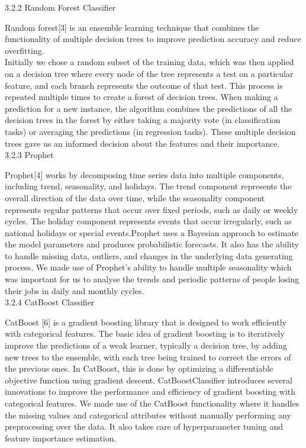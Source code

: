 \documentclass[fleqn,10pt]{SelfArx} %
\begin{document}
3.2.2 Random Forest Classifier 

Random forest[3] is an ensemble learning technique that combines the functionality of multiple decision trees to improve prediction accuracy and reduce overfitting.\\
Initially we chose a random subset of the training data, which was then applied on a decision tree where every node of the tree represents a test on a particular feature, and each branch represents the outcome of that test. This process is repeated multiple times to create a forest of decision trees.
When making a prediction for a new instance, the algorithm combines the predictions of all the decision trees in the forest by either taking a majority vote (in classification tasks) or averaging the predictions (in regression tasks). These multiple decision trees gave us an informed decision about the features and their importance. \\

3.2.3 Prophet

Prophet[4] works by decomposing time series data into multiple components, including trend, seasonality, and holidays. The trend component represents the overall direction of the data over time, while the seasonality component represents regular patterns that occur over fixed periods, such as daily or weekly cycles. The holiday component represents events that occur irregularly, such as national holidays or special events.Prophet uses a Bayesian approach to estimate the model parameters and produces probabilistic forecasts. It also has the ability to handle missing data, outliers, and changes in the underlying data generating process. We made use of Prophet's ability to handle multiple seasonality which was important for us to analyse the trends and periodic patterns of people losing their jobs in daily and monthly cycles. \\

3.2.4 CatBoost Classifier

CatBoost [6] is a gradient boosting library that is designed to work efficiently with categorical features. The basic idea of gradient boosting is to iteratively improve the predictions of a weak learner, typically a decision tree, by adding new trees to the ensemble, with each tree being trained to correct the errors of the previous ones. In CatBoost, this is done by optimizing a differentiable objective function using gradient descent. CatBoostClassifier introduces several innovations to improve the performance and efficiency of gradient boosting with categorical features. We made use of the CatBoost functionality where it handles the missing values and categorical attributes without manually performing any preprocessing over the data. It also takes care of hyperparameter tuning and feature importance estimation.\\
\end{document}
